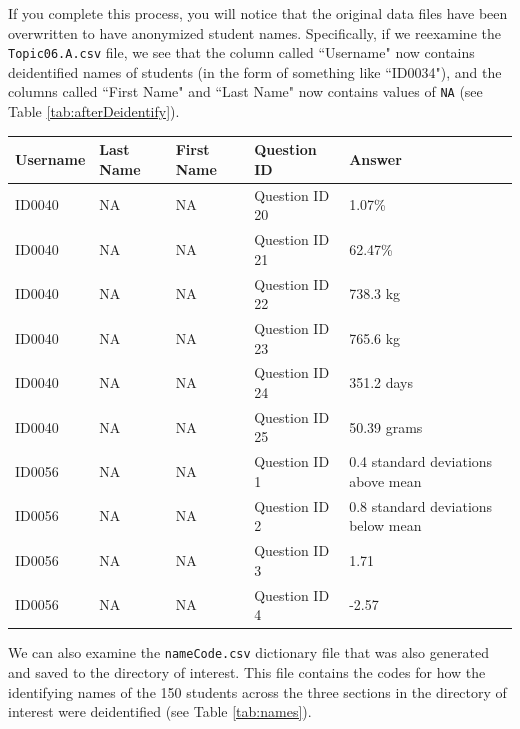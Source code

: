 \documentclass{article}\usepackage[]{graphicx}\usepackage[]{color}
\numberwithin{equation}{section} %
\begin{document}
If you complete this process, you will notice that the original data files have been overwritten to have anonymized student names. Specifically, if we reexamine the \texttt{Topic06.A.csv} file, we see that the column called ``Username" now contains deidentified names of students (in the form of something like ``ID0034"), and the columns called ``First Name" and ``Last Name" now contains values of \texttt{NA} (see Table \ref{tab:afterDeidentify}).

\begin{center}
\label{tab:afterDeidentify}
\begin{tabular} { | l | l | l | l | l |}
\hline \textbf{Username} & \textbf{Last Name} & \textbf{First Name} & \textbf{Question ID} & \textbf{Answer} \\
\hline
ID0040 & NA & NA & Question ID 20 & 1.07\% \\
\hline
ID0040 & NA & NA & Question ID 21 & 62.47\% \\
\hline
ID0040 & NA & NA & Question ID 22 & 738.3 kg \\
\hline
ID0040 & NA & NA & Question ID 23 & 765.6 kg\\
\hline
ID0040 & NA & NA & Question ID 24 & 351.2 days \\
\hline
ID0040 & NA & NA & Question ID 25 & 50.39 grams \\
\hline
ID0056 & NA & NA & Question ID 1 & 0.4 standard deviations above mean \\
\hline
ID0056 & NA & NA & Question ID 2 & 0.8 standard deviations below mean \\
\hline
ID0056 & NA & NA & Question ID 3 & 1.71 \\
\hline
ID0056 & NA & NA & Question ID 4 & -2.57 \\
\hline
\end{tabular}
\end{center}

We can also examine the \texttt{nameCode.csv} dictionary file that was also generated and saved to the directory of interest. This file contains the codes for how the identifying names of the 150 students across the three sections in the directory of interest were deidentified (see Table \ref{tab:names}).
\end{document}

